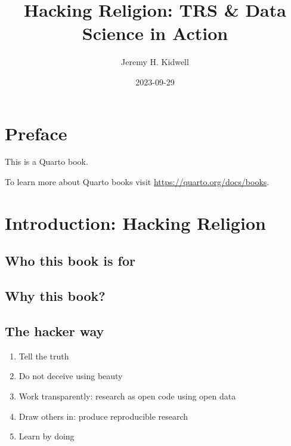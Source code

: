 \documentclass[
  letterpaper,
  DIV=11,
  numbers=noendperiod]{scrreprt}
\title{Hacking Religion: TRS \& Data Science in Action}
\author{Jeremy H. Kidwell}
\date{2023-09-29}
\renewcommand*\contentsname{Table of contents}
\newcommand\contentsname{Table of contents}
\begin{document}
\maketitle
\ifdefined\Shaded\renewenvironment{Shaded}{\begin{tcolorbox}[frame hidden, interior hidden, borderline west={3pt}{0pt}{shadecolor}, enhanced, boxrule=0pt, breakable, sharp corners]}{\end{tcolorbox}}\fi

\renewcommand*\contentsname{Table of contents}
{
\hypersetup{linkcolor=}
\setcounter{tocdepth}{2}
\tableofcontents
}

\hypertarget{preface}{%
\chapter*{Preface}\label{preface}}


This is a Quarto book.

To learn more about Quarto books visit
\url{https://quarto.org/docs/books}.


\hypertarget{introduction-hacking-religion}{%
\chapter{Introduction: Hacking
Religion}\label{introduction-hacking-religion}}

\hypertarget{who-this-book-is-for}{%
\section{Who this book is for}\label{who-this-book-is-for}}

\hypertarget{why-this-book}{%
\section{Why this book?}\label{why-this-book}}

\hypertarget{the-hacker-way}{%
\section{The hacker way}\label{the-hacker-way}}

\begin{enumerate}
\def\labelenumi{\arabic{enumi}.}
\item
  Tell the truth
\item
  Do not deceive using beauty
\item
  Work transparently: research as open code using open data
\item
  Draw others in: produce reproducible research
\item
  Learn by doing
\end{enumerate}
\end{document}
